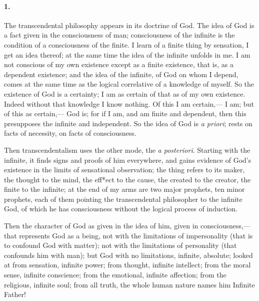 \documentclass[12pt]{article}
\begin{document}
\paragraph{1.} The transcendental philosophy appears in its doctrine of God. The idea of God is a fact given in the consciousness of man; consciousness of the infinite is the condition of a consciousness of the finite. I learn of a finite thing by sensation, I get an idea thereof; at the same time the idea of the infinite unfolds in me. I am not conscious of my own existence except as a finite existence, that is, as a dependent existence; and the idea of the infinite, of God on whom I depend, comes at the same time as the logical correlative of a knowledge of myself. So the existence of God is a certainty; I am as certain of that as of my own existence. Indeed without that knowledge I know nothing. Of this I am certain,--- I am; but of this as certain,--- God is; for if I am, and am finite and dependent, then this presupposes the infinite and independent. So the idea of God is \emph{a priori}; rests on facts of necessity, on facts of consciousness. 

Then transcendentalism uses the other mode, the \emph{a posteriori}. Starting with the infinite, it finds signs and proofs of him everywhere, and gains evidence of God's existence in the limits of sensational observation; the thing refers to its maker, the thought to the mind, the eff*ect to the cause, the created to the creator, the finite to the infinite; at the end of my arms are two major prophets, ten minor prophets, each of them pointing the transcendental philosopher to the infinite God, of which he has consciousness without the logical process of induction. 

Then the character of God as given in the idea of him, given in consciousness,--- that represents God as a being, not with the limitations of impersonality (that is to confound God with matter); not with the limitations of personality (that confounds him with man); but God with no limitations, infinite, absolute; looked at from sensation, infinite power; from thought, infinite intellect; from the moral sense, infinite conscience; from the emotional, infinite affection; from the religious, infinite soul; from all truth, the whole human nature names him Infinite Father! 
\end{document}
